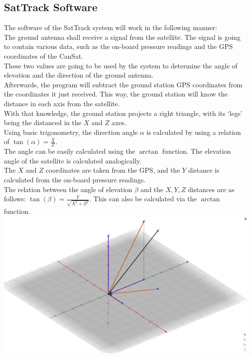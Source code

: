 \documentclass[class=report, crop=false]{standalone}
\begin{document}
\subsection*{SatTrack Software}
The software of the SatTrack system will work in the following manner: \\
The ground antenna shall receive a signal from the satellite. The signal is going to contain various data, such as the on-board pressure readings and the GPS coordinates of the CanSat. \\
These two values are going to be used by the system to determine the angle of elevation and the direction of the ground antenna. \\
Afterwards, the program will subtract the ground station GPS coordinates from the coordinates it just received.
This way, the ground station will know the distance in each axis from the satellite. \\
With that knowledge, the ground station projects a right triangle, with its `legs' being the distanced in the $X$ and $Z$ axes. \\
Using basic trigonometry, the direction angle $\alpha$ is calculated by using a relation of $\tan\left(\alpha\right) = \frac{X}{Z}$. \\
The angle can be easily calculated using the $\arctan$ function. The elevation angle of the satellite is calculated analogically. \\
The $X$ and $Z$ coordinates are taken from the GPS, and the $Y$ distance is calculated from the on-board pressure readings. \\
The relation between the angle of elevation $\beta$ and the $X,Y,Z$ distances are as follows: $\tan\left(\beta\right) =\frac{Y}{\sqrt{X^2+Z^2}}$. This can also be calculated via the $\arctan$ function. \\

\includegraphics[width=\columnwidth]{ext/sattrackschema.png}
\end{document}
